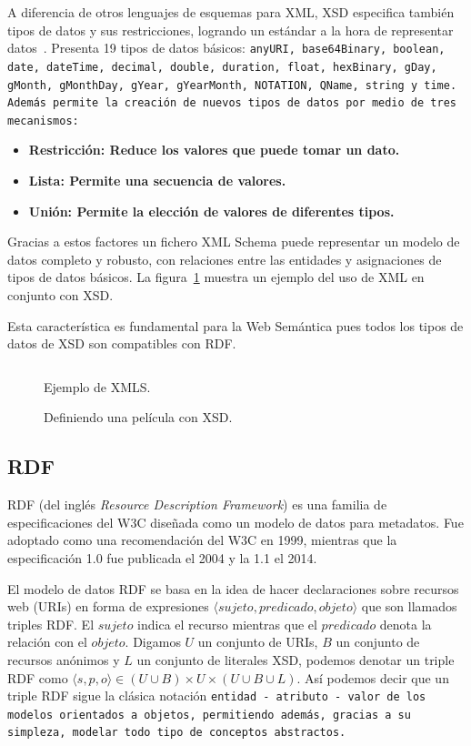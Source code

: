 A diferencia de otros lenguajes de esquemas para XML, XSD especifica también
tipos de datos y sus restricciones, logrando un estándar a la hora de
representar datos~\cite{biron2004xml}. 
Presenta 19 tipos de datos básicos: \tt{anyURI},
\tt{base64Binary}, \tt{boolean}, \tt{date}, \tt{dateTime}, \tt{decimal},
\tt{double}, \tt{duration}, \tt{float}, \tt{hexBinary}, \tt{gDay}, \tt{gMonth},
\tt{gMonthDay}, \tt{gYear}, \tt{gYearMonth}, \tt{NOTATION}, \tt{QName},
\tt{string} y \tt{time}. Además permite la creación de nuevos tipos de datos por
medio de tres mecanismos:
\begin{itemize}
  \item \bf{Restricción:} Reduce los valores que puede tomar un dato.
  \item \bf{Lista:} Permite una secuencia de valores.
  \item \bf{Unión:} Permite la elección de valores de diferentes tipos.
\end{itemize}

Gracias a estos factores un fichero XML Schema puede representar un modelo de
datos completo y robusto, con relaciones entre las entidades y asignaciones de 
tipos de datos básicos. La figura~\ref{fig:xsdex} muestra un ejemplo del uso de
XML en conjunto con XSD.

Esta característica es fundamental para la Web Semántica pues todos los tipos de
datos de XSD son compatibles con RDF.

\begin{figure}[htpb]
  \centering
  \begin{tabular}{c}
    
  \end{tabular}
  \caption{Ejemplo de XMLS.}
  \vspace{-.25cm}
  \caption*{Definiendo una película con XSD.}
  \label{fig:xsdex}
\end{figure}

\subsection{RDF}\label{sw:rdf}
RDF (del inglés \emph{Resource Description Framework}) es una familia de
especificaciones del W3C diseñada como un modelo de datos para metadatos.
Fue adoptado como una recomendación del W3C en 1999, mientras que la
especificación 1.0 fue publicada el 2004 y la 1.1 el
2014\cite{bikakis2013semantic}.

El modelo de datos RDF se basa en la idea de hacer declaraciones sobre 
recursos web (URIs) en forma de expresiones $\langle sujeto, predicado, objeto
\rangle$ que son llamados triples RDF.
El $sujeto$ indica el recurso mientras que el $predicado$ denota la relación
con el $objeto$.
Digamos $U$ un conjunto de URIs, $B$ un conjunto de recursos anónimos y $L$ un
conjunto de literales XSD, podemos denotar un triple RDF como 
$\langle s,p,o\rangle \in (U\cup B) \times U \times (U\cup B\cup L)$.
Así podemos decir que un triple RDF sigue la clásica notación \tt{entidad} - 
\tt{atributo} - \tt{valor} de los modelos orientados a objetos, permitiendo
además, gracias a su simpleza, modelar todo tipo de conceptos abstractos.

